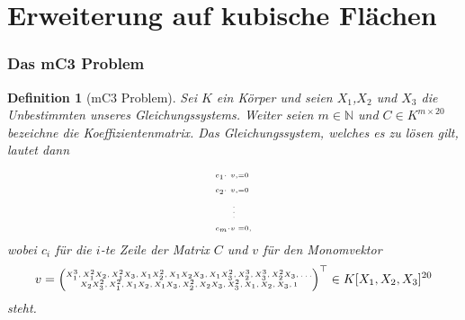 \documentclass[11pt]{beamer}
\newcommand{\N}{{\mathbb N}}
\theoremstyle{custom}
\theoremstyle{custom}
\newtheorem{dfn}[theorem]{Definition}
\begin{document}
	\section{Erweiterung auf kubische Flächen}
	\begin{frame}
		\frametitle{Das mC3 Problem}
		\begin{dfn}[mC3 Problem]
			Sei $K$ ein Körper und seien $X_1$,$X_{2}$ und $X_{3}$ die Unbestimmten unseres Gleichungssystems. Weiter seien $m \in \N$ und $C \in K^{m\times 20}$ bezeichne die Koeffizientenmatrix. Das Gleichungssystem, welches es zu lösen gilt, lautet dann
			\begin{gather}\label{eqn:mC3}
				\tiny
				\begin{alignedat}{5}
					& c_{1} \cdot &v&,
					&=&0\\
					& c_{2} \cdot &v&,
					&=&0\\
					&&\vdots&&&\\
					& c_{m} \cdot &v&
					&=&0,
				\end{alignedat}
			\end{gather}
			wobei $c_{i}$ für die $i$-te Zeile der Matrix $C$ und $v$ für den Monomvektor 
			\begin{equation*}
				\tiny
				v = 	
				\begin{pmatrix}
					X_{1}^3,X_{1}^2X_{2},X_{1}^2X_{3},X_{1}X_{2}^2,X_{1}X_{2}X_{3},X_{1}X_{3}^2,X_{2}^3,X_{3}^3,X_{2}^2X_{3},\ldots \\
					X_{2}X_{3}^2,X_{1}^2,X_{1}X_{2},X_{1}X_{3},X_{2}^2,X_{2}X_{3},X_{3}^2,X_{1},X_{2},X_{3},1
				\end{pmatrix}
				^{\top} \in K[X_1,X_2,X_3]^{20}
			\end{equation*}
			steht.
		\end{dfn}
	\end{frame}
\end{document}
